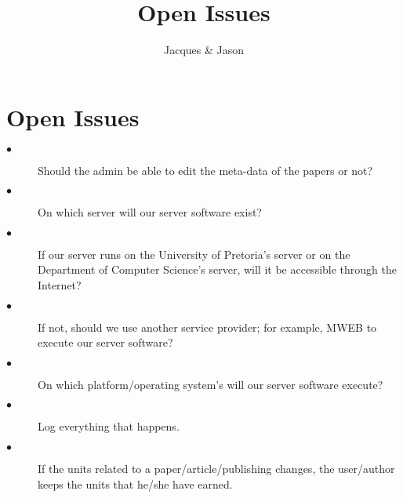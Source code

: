 \documentclass[10pt,a4paper]{article}
\author{Jacques & Jason}
\title{Open Issues}
\begin{document}
	\section{Open Issues}
	
	\begin{description}	
		\item[$\bullet$] Should the admin be able to edit the meta-data of the papers or not?
		\item[$\bullet$] On which server will our server software exist?
		\item[$\bullet$] If our server runs on the University of Pretoria's server or on the 
		Department of Computer Science's server, will it be accessible through the Internet?
		\item[$\bullet$] If not, should we use another service provider; for example, MWEB to 
		execute our server software?
		\item[$\bullet$] On which platform/operating system's will our server software execute?
		\item[$\bullet$] Log everything that happens.
		\item[$\bullet$] If the units related to a paper/article/publishing changes, the 
		user/author keeps the units that he/she have earned.  
	\end{description}
 	
\end{document}
